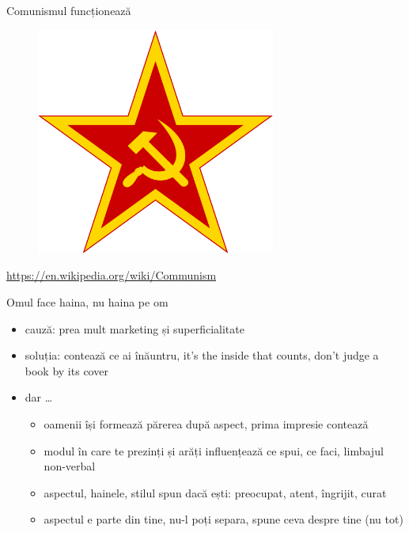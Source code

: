 \documentclass{simple}
\begin{document}
\begin{frame}{Comunismul funcționează}
  \centering
  \begin{figure}
    \includegraphics[width=0.7\textwidth]{img/communism}
  \end{figure}
  \tiny
  \url{https://en.wikipedia.org/wiki/Communism}
\end{frame}

\begin{frame}{Omul face haina, nu haina pe om}
  \begin{itemize}
    \pause \item cauză: prea mult marketing și superficialitate
    \pause \item soluția: contează ce ai înăuntru, it's the inside that counts, don't judge a book by its cover
    \pause \item dar \ldots
      \begin{itemize}
        \pause \item oamenii își formează părerea după aspect, prima impresie contează
        \pause \item modul în care te prezinți și arăți influențează ce spui, ce faci, limbajul non-verbal
        \pause \item aspectul, hainele, stilul spun dacă ești: preocupat, atent, îngrijit, curat
        \pause \item aspectul e parte din tine, nu-l poți separa, spune ceva despre tine (nu tot)
      \end{itemize}
  \end{itemize}
\end{frame}
\end{document}
